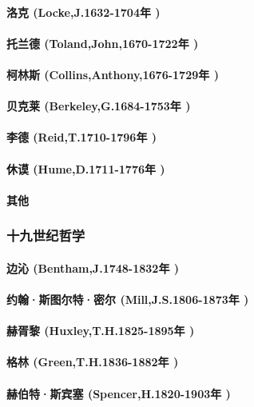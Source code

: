 \documentclass[UTF8]{../RepresentationUniverse}
\begin{document}
    \paragraph{洛克 (Locke,J.1632-1704年 )}
    \paragraph{托兰德 (Toland,John,1670-1722年 )}
    \paragraph{柯林斯 (Collins,Anthony,1676-1729年 )}
    \paragraph{贝克莱 (Berkeley,G.1684-1753年 )}
    \paragraph{李德 (Reid,T.1710-1796年 )}
    \paragraph{休谟 (Hume,D.1711-1776年 )}
    \paragraph{其他}

\subsubsection{十九世纪哲学}
    \paragraph{边沁 (Bentham,J.1748-1832年 )}
    \paragraph{约翰·斯图尔特·密尔 (Mill,J.S.1806-1873年 )}
    \paragraph{赫胥黎 (Huxley,T.H.1825-1895年 )}
    \paragraph{格林 (Green,T.H.1836-1882年 )}
    \paragraph{赫伯特·斯宾塞 (Spencer,H.1820-1903年 )}
\end{document}
